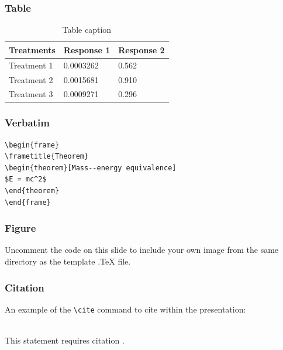 \documentclass{beamer}
\begin{document}
\begin{frame}
\frametitle{Table}
\begin{table}
\begin{tabular}{l l l}
\toprule
\textbf{Treatments} & \textbf{Response 1} & \textbf{Response 2}\\
\midrule
Treatment 1 & 0.0003262 & 0.562 \\
Treatment 2 & 0.0015681 & 0.910 \\
Treatment 3 & 0.0009271 & 0.296 \\
\bottomrule
\end{tabular}
\caption{Table caption}
\end{table}
\end{frame}







\begin{frame}[fragile] %
\frametitle{Verbatim}
\begin{example}
\begin{verbatim}
\begin{frame}
\frametitle{Theorem}
\begin{theorem}[Mass--energy equivalence]
$E = mc^2$
\end{theorem}
\end{frame}\end{verbatim}
\end{example}
\end{frame}


\begin{frame}
\frametitle{Figure}
Uncomment the code on this slide to include your own image from the same directory as the template .TeX file.
\end{frame}


\begin{frame}[fragile] %
\frametitle{Citation}
An example of the \verb|\cite| command to cite within the presentation:\\~

This statement requires citation \cite{p1}.
\end{frame}
\end{document}
